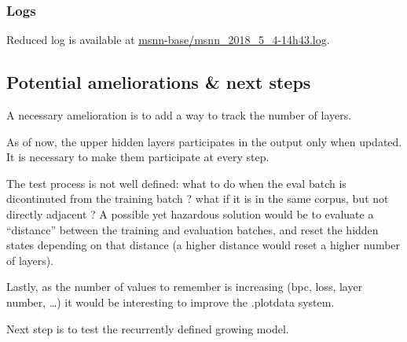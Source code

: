 \subsubsection{Logs}

Reduced log is available at \href{msnn-base/msnn_2018_5_4-14h43.log}{msnn-base/msnn\_2018\_5\_4-14h43.log}.

\subsection{Potential ameliorations \& next steps}

A necessary amelioration is to add a way to track the number of layers.

As of now, the upper hidden layers participates in the output only when
updated. It is necessary to make them participate at every step.

The test process is not well defined: what to do when the eval batch is
dicontinuted from the training batch ? what if it is in the same corpus,
but not directly adjacent ? A possible yet hazardous solution would be
to evaluate a ``distance'' between the training and evaluation batches,
and reset the hidden states depending on that distance (a higher
distance would reset a higher number of layers).

Lastly, as the number of values to remember is increasing (bpc, loss,
layer number, \ldots{}) it would be interesting to improve the .plotdata
system.

Next step is to test the recurrently defined growing model.
